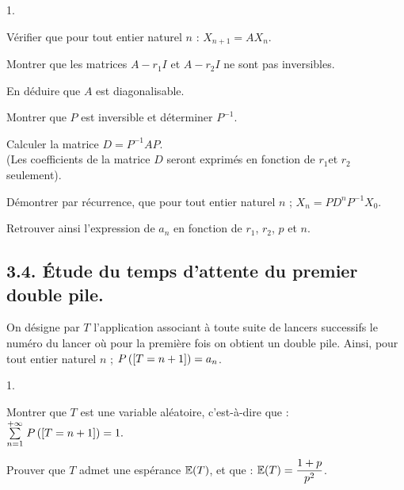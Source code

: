 \documentclass[11pt]{article}%
\begin{document}
\begin{noliste}{1.}
 \setlength{\itemsep}{4mm}
\item Vérifier que pour tout entier naturel $n$ : $X_{n + 1} = AX_{n}$.

\item Montrer que les matrices $A-r_{1}I$ et $A-r_{2}I$ ne sont pas
inversibles.

\item En déduire que $A$ est diagonalisable.

\item Montrer que $P$ est inversible et déterminer $P^{-1}$.

\item Calculer la matrice $D = P^{-1}AP$.\\
(Les coefficients de la matrice $D$ seront exprimés en fonction de
$r_{1}$et $r_{2}$ seulement).

\item Démontrer par récurrence, que pour tout entier naturel $n$ ;
$X_{n} = PD^{n}P^{-1}X_{0}.$

\item Retrouver ainsi l'expression de $a_{n}$ en fonction de $r_{1}$,
$r_{2}$, $p$ et $n$.
\end{noliste}

\subsection*{3.4. Étude du temps d'attente du premier double pile.}

On désigne par $T$ l'application associant à toute suite de lancers
successifs le numéro du lancer où pour la première fois on obtient un
double
pile. Ainsi, pour tout entier naturel $n$ ; $P\left(\left[ {T = n +
1} \right]\right) = a_{n}$.

\begin{noliste}{1.}
 \setlength{\itemsep}{4mm}
\item Montrer que $T$ est une variable aléatoire, c'est-à-dire que :
${\textstyle\sum\limits_{n = 1}^{+ \infty }}\hspace{.1cm}P\left(\left[ {T = n + 1} \right]\right) = 1.$

\item Prouver que $T$ admet une espérance $\mathbb{E}(T)$, et que : $\mathbb{E}(T) =
\dfrac{{1 + p}}{p^{2}}$.
\end{noliste}

\label{fin}
\end{document}
